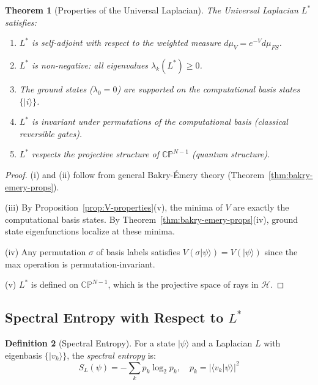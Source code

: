 \documentclass[11pt,a4paper]{article}
\theoremstyle{plain}
\newtheorem{theorem}{Theorem}[section]
\theoremstyle{definition}
\newtheorem{definition}[theorem]{Definition}
\theoremstyle{remark}
\newcommand{\Hilbert}{\mathcal{H}}
\newcommand{\CP}{\mathbb{CP}}
\newcommand{\ket}[1]{|#1\rangle}
\newcommand{\braket}[2]{\langle#1|#2\rangle}
\begin{document}
\begin{theorem}[Properties of the Universal Laplacian]\label{thm:universal-props}
The Universal Laplacian $L^*$ satisfies:
\begin{enumerate}[label=(\roman*),noitemsep]
    \item $L^*$ is self-adjoint with respect to the weighted measure $d\mu_V = e^{-V}d\mu_{FS}$.
    \item $L^*$ is non-negative: all eigenvalues $\lambda_k(L^*) \geq 0$.
    \item The ground states ($\lambda_0 = 0$) are supported on the computational basis states $\{\ket{i}\}$.
    \item $L^*$ is invariant under permutations of the computational basis (classical reversible gates).
    \item $L^*$ respects the projective structure of $\CP^{N-1}$ (quantum structure).
\end{enumerate}
\end{theorem}

\begin{proof}
(i) and (ii) follow from general Bakry-\'Emery theory (Theorem~\ref{thm:bakry-emery-props}).

(iii) By Proposition~\ref{prop:V-properties}(v), the minima of $V$ are exactly the computational basis states. By Theorem~\ref{thm:bakry-emery-props}(iv), ground state eigenfunctions localize at these minima.

(iv) Any permutation $\sigma$ of basis labels satisfies $V(\sigma\ket{\psi}) = V(\ket{\psi})$ since the max operation is permutation-invariant.

(v) $L^*$ is defined on $\CP^{N-1}$, which is the projective space of rays in $\Hilbert$.
\end{proof}

\subsection{Spectral Entropy with Respect to $L^*$}

\begin{definition}[Spectral Entropy]
For a state $\ket{\psi}$ and a Laplacian $L$ with eigenbasis $\{\ket{v_k}\}$, the \emph{spectral entropy} is:
\begin{equation}
    S_L(\psi) = -\sum_k p_k \log_2 p_k, \quad p_k = |\braket{v_k}{\psi}|^2
\end{equation}
\end{definition}
\end{document}

